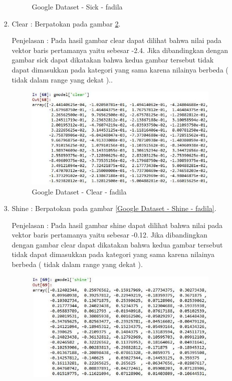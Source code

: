 \begin{enumerate}
\begin{enumerate}
\begin{enumerate}
\begin{figure}[!hbtp]
\caption{Google Dataset - Sick - fadila}
\label{Google Dataset - Sick - fadila}
\end{figure}
\par
\item Clear :  Berpatokan pada gambar \ref{Google Dataset - Clear - fadila}.
\par Penjelasan : Pada hasil gambar clear dapat dilihat bahwa nilai pada vektor baris pertamanya yaitu sebesar -2.4. Jika dibandingkan dengan gambar sick dapat dikatakan bahwa kedua gambar tersebut tidak dapat dimasukkan pada kategori yang sama  karena nilainya berbeda ( tidak dalam range yang dekat )..
\par
\begin{figure}[!hbtp]
\centering
\includegraphics[scale=0.3]{figures/1-clear-fadila.jpg}
\caption{Google Dataset - Clear - fadila}
\label{Google Dataset - Clear - fadila}
\end{figure}
\par
\item Shine : Berpatokan pada gambar \ref{Google Dataset - Shine - fadila}.
\par Penjelasan : Pada hasil gambar shine dapat dilihat bahwa nilai pada vektor baris pertamanya yaitu sebesar -0.12. Jika dibandingkan dengan gambar clear dapat dikatakan bahwa kedua gambar tersebut tidak dapat dimasukkan pada kategori yang sama karena nilainya berbeda ( tidak dalam range yang dekat ).
\par
\begin{figure}[!hbtp]
\centering
\includegraphics[scale=0.3]{figures/1-shine-fadila.jpg}

\end{figure}
\end{enumerate}
\end{enumerate}
\end{enumerate}
